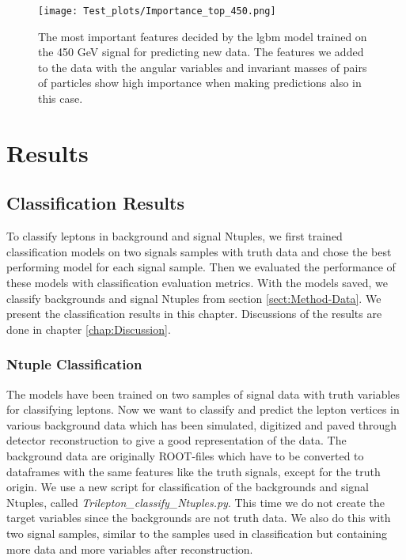 \documentclass[a4paper, american, 12pt]{report}
\begin{document}
	\begin{figure}[htb!]
		\centering\texttt{[image: Test\_plots/Importance\_top\_450.png]}
		\caption[Test set most important features of the \acrshort{lgbm} model trained on the 450 GeV signal.]{The most important features decided by the \acrshort{lgbm} model trained on the 450 GeV signal for predicting new data. The features we added to the data with the angular variables and invariant masses of pairs of particles show high importance when making predictions also in this case. \label{fig:ImpTop_450}}
	\end{figure}

	

	\part{Results}
	\label{part:Results} 
	
	\chapter{Classification Results}
	\label{chap:Result-ClassResult}
	To classify leptons in background and signal Ntuples, we first trained classification models on two signals samples with truth data and chose the best performing model for each signal sample. Then we evaluated the performance of these models with classification evaluation metrics. With the models saved, we classify backgrounds and signal Ntuples from section \ref{sect:Method-Data}. We present the classification results in this chapter. Discussions of the results are done in chapter \ref{chap:Discussion}.
	
	
	\section{Ntuple Classification} 
	\label{sect:Result-BkgClass}
	The models have been trained on two samples of signal data with truth variables for classifying leptons. Now we want to classify and predict the lepton vertices in various background data which has been simulated, digitized and paved through detector reconstruction to give a good representation of the data. The background data are originally ROOT-files which have to be converted to dataframes with the same features like the truth signals, except for the truth origin. We use a new script for classification of the backgrounds and signal Ntuples, called \textit{Trilepton\_classify\_Ntuples.py}. This time we do not create the target variables since the backgrounds are not truth data. We also do this with two signal samples, similar to the samples used in classification but containing more data and more variables after reconstruction.
	
\end{document}
